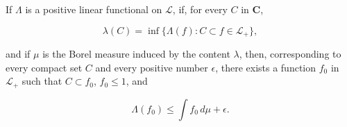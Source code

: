 If $\Lambda$ is a positive linear functional on $\mathcal{L}$, if, for every $C$ in $\mathbf{C}$,

$$\lambda(C) = \inf \{ \Lambda(f) : C \subset f \in \mathcal{L}_+ \},$$

and if $\mu$ is the Borel measure induced by the content $\lambda$, then, corresponding to every compact set $C$ and every positive number $\epsilon$, there exists a function $f_0$ in $\mathcal{L}_+$ such that $C \subset f_0$, $f_0 \leq 1$, and

$$\Lambda(f_0) \leq \int f_0 \, d\mu + \epsilon.$$
